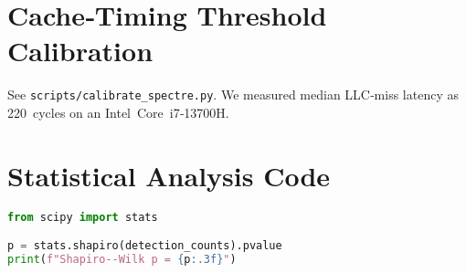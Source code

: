 \documentclass[11pt,letterpaper]{article}
\begin{document}
\appendix

\section{Cache‑Timing Threshold Calibration}
\label{app:threshold}
See \texttt{scripts/calibrate\_spectre.py}. We measured median LLC‑miss latency as \SI{220}{cycles} on an Intel Core i7‑13700H.

\section{Statistical Analysis Code}
\label{app:stats}
\begin{lstlisting}[caption={Python snippet for Shapiro--Wilk test},label={lst:stats},language=Python]
from scipy import stats

p = stats.shapiro(detection_counts).pvalue
print(f"Shapiro--Wilk p = {p:.3f}")
\end{lstlisting}
\end{document}
